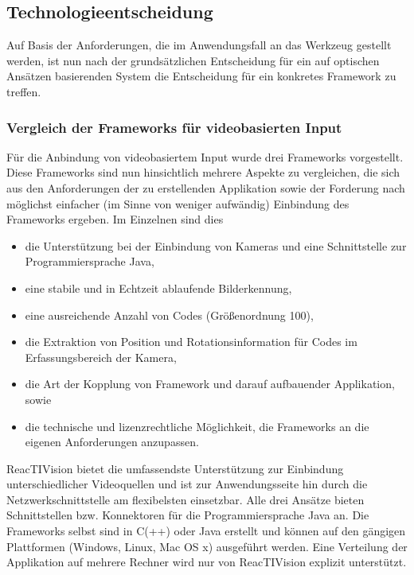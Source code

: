 
\subsection{Technologieentscheidung} %
\label{sub:technologieentscheidung}

Auf Basis der Anforderungen, die im Anwendungsfall an das Werkzeug gestellt werden, ist nun nach der grundsätzlichen Entscheidung für ein auf optischen Ansätzen basierenden System die Entscheidung für ein konkretes Framework zu treffen. 

\subsubsection{Vergleich der Frameworks für videobasierten Input}\label{subs:vergleich_video_frameworks}

Für die Anbindung von videobasiertem Input wurde drei Frameworks vorgestellt. Diese Frameworks sind nun hinsichtlich mehrere Aspekte zu vergleichen, die sich aus den Anforderungen der zu erstellenden Applikation sowie der Forderung nach möglichst einfacher (im Sinne von weniger aufwändig) Einbindung des Frameworks ergeben. Im Einzelnen sind dies 
\begin{itemize}
	\item die Unterstützung bei der Einbindung von Kameras und eine Schnittstelle zur Programmiersprache Java,
	\item eine stabile und in Echtzeit ablaufende Bilderkennung,
	\item eine ausreichende Anzahl von Codes (Größenordnung 100),
	\item die Extraktion von Position und Rotationsinformation für Codes im Erfassungsbereich der Kamera,
	\item die Art der Kopplung von Framework und darauf aufbauender Applikation, sowie
	\item die technische und lizenzrechtliche Möglichkeit, die Frameworks an die eigenen Anforderungen anzupassen.
\end{itemize}
    
ReacTIVision bietet die umfassendste Unterstützung zur Einbindung unterschiedlicher Videoquellen und ist zur Anwendungsseite hin durch die Netzwerkschnittstelle am flexibelsten einsetzbar. Alle drei Ansätze bieten Schnittstellen bzw. Konnektoren für die Programmiersprache Java an. Die Frameworks selbst sind in C(++) oder Java erstellt und können auf den gängigen Plattformen (Windows, Linux, Mac OS x) ausgeführt werden. Eine Verteilung der Applikation auf mehrere Rechner wird nur von ReacTIVision explizit unterstützt.

